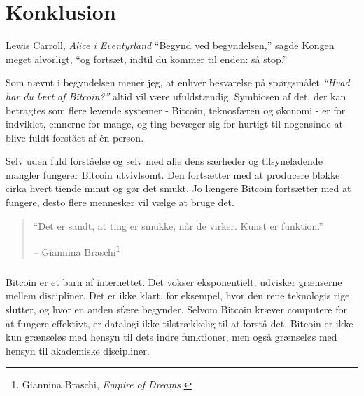 \label{ch:konklusion}

\chapter*{Konklusion}

\begin{chapquote}{Lewis Carroll, \textit{Alice i Eventyrland}}
\enquote{Begynd ved begyndelsen,} sagde Kongen meget alvorligt, \enquote{og 
fortsæt, indtil du kommer til enden: så stop.}
\end{chapquote}

Som nævnt i begyndelsen mener jeg, at enhver besvarelse på spørgsmålet 
\textit{“Hvad har du lært af Bitcoin?”} altid vil være ufuldstændig. Symbiosen 
af det, der kan betragtes som flere levende systemer - Bitcoin, teknosfæren og 
økonomi - er for indviklet, emnerne for mange, og ting bevæger sig for hurtigt 
til nogensinde at blive fuldt forstået af én person.

Selv uden fuld forståelse og selv med alle dens særheder og tilsyneladende 
mangler fungerer Bitcoin utvivlsomt. Den fortsætter med at producere blokke 
cirka hvert tiende minut og gør det smukt. Jo længere Bitcoin fortsætter med at 
fungere, desto flere mennesker vil vælge at bruge det.

\begin{quotation}\begin{samepage}
\enquote{Det er sandt, at ting er smukke, når de virker. Kunst er funktion.}
\begin{flushright} -- Giannina Braschi\footnote{Giannina Braschi, \textit{Empire of Dreams} \cite{braschi2011empire}}
\end{flushright}\end{samepage}\end{quotation}

\paragraph{} Bitcoin er et barn af internettet. Det vokser eksponentielt, 
udvisker grænserne mellem discipliner. Det er ikke klart, for eksempel, hvor 
den rene teknologis rige slutter, og hvor en anden sfære begynder. Selvom 
Bitcoin kræver computere for at fungere effektivt, er datalogi ikke 
tilstrækkelig til at forstå det. Bitcoin er ikke kun grænseløs med hensyn til 
dets indre funktioner, men også grænseløs med hensyn til akademiske discipliner.


